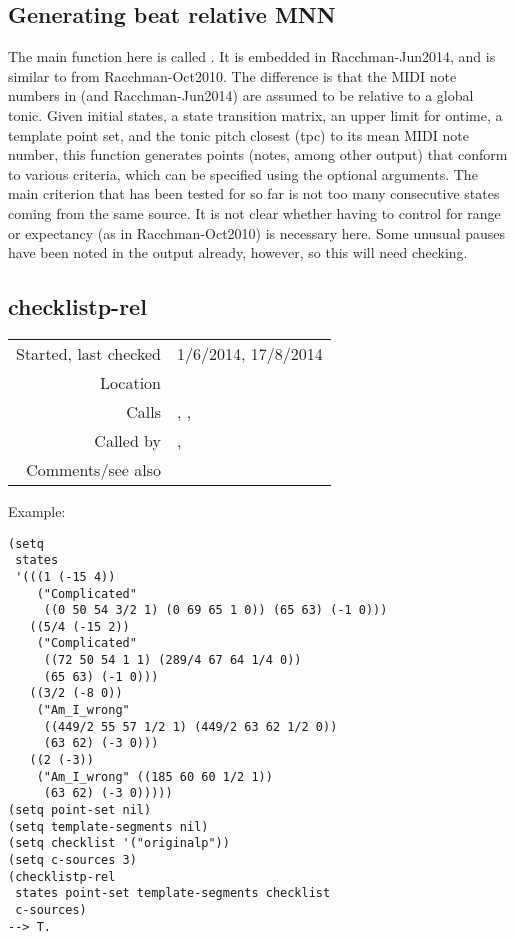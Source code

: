 \subsection{Generating beat relative MNN}\label{sec:generating-beat-relative-MNN}

The main function here is called
. It is embedded
in Racchman-Jun2014, and is similar to
 from
Racchman-Oct2010. The difference is that the MIDI note
numbers in  (and
Racchman-Jun2014) are assumed to be relative to a
global tonic. Given initial states, a state transition
matrix, an upper limit for ontime, a template point
set, and the tonic pitch closest (tpc) to its mean
MIDI note number, this function generates points
(notes, among other output) that conform to various
criteria, which can be specified using the optional
arguments. The main criterion that has been tested for
 so far is not
too many consecutive states coming from the same
source. It is not clear whether having to control for
range or expectancy (as in Racchman-Oct2010) is
necessary here. Some unusual pauses have been noted in
the output already, however, so this will need
checking.


\subsection*{checklistp-rel}\label{fun:checklistp-rel}

\vspace{0.3cm}
\begin{tabular}{r|p{8cm}}
Started, last checked & 1/6/2014, 17/8/2014 \\
Location & \nameref{sec:generating-beat-relative-MNN} \\
Calls & \nameref{fun:index-item-1st-doesnt-occur}, \nameref{fun:lastn},\newline \nameref{fun:my-last} \\
Called by & \nameref{fun:generate-beat-rel-MNN->},\newline \nameref{fun:generate-beat-rel-MNN-forcing->} \\
Comments/see also & \nameref{fun:checklist<-p-rel}
\end{tabular}

\vspace{0.5cm}
\noindent Example:
\begin{verbatim}
(setq
 states
 '(((1 (-15 4))
    ("Complicated"
     ((0 50 54 3/2 1) (0 69 65 1 0)) (65 63) (-1 0)))
   ((5/4 (-15 2))
    ("Complicated"
     ((72 50 54 1 1) (289/4 67 64 1/4 0))
     (65 63) (-1 0)))
   ((3/2 (-8 0))
    ("Am_I_wrong"
     ((449/2 55 57 1/2 1) (449/2 63 62 1/2 0))
     (63 62) (-3 0)))
   ((2 (-3))
    ("Am_I_wrong" ((185 60 60 1/2 1))
     (63 62) (-3 0)))))
(setq point-set nil)
(setq template-segments nil)
(setq checklist '("originalp"))
(setq c-sources 3)
(checklistp-rel
 states point-set template-segments checklist
 c-sources)
--> T.
\end{verbatim}

